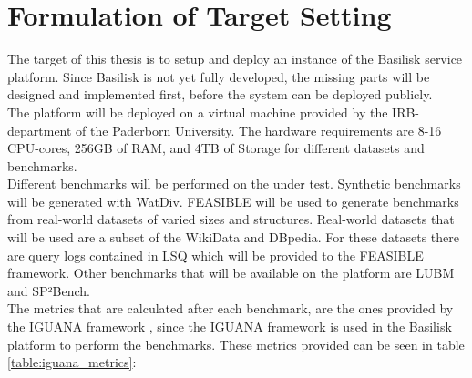 \chapter{Formulation of Target Setting}
\label{ch:target_setting}

The target of this thesis is to setup and deploy an instance of the Basilisk service platform.
Since Basilisk is not yet fully developed, the missing parts will be designed and implemented first, before the system can be deployed publicly. \\

The platform will be deployed on a virtual machine provided by the IRB-department of the Paderborn University.
The hardware requirements are 8-16 CPU-cores, 256GB of RAM, and 4TB of Storage for different datasets and benchmarks. \\

Different benchmarks will be performed on the \tsp{} under test.
Synthetic benchmarks will be generated with WatDiv\cite{alucDiversifiedStressTesting2014}.
FEASIBLE\cite{saleemFEASIBLEFeatureBasedSPARQL2015} will be used to generate benchmarks from real-world datasets of varied sizes and structures.
Real-world datasets that will be used are a subset of the WikiData and DBpedia.
For these datasets there are query logs contained in LSQ\cite{saleemLSQLinkedSPARQL2015} which will be provided to the FEASIBLE framework.
Other benchmarks that will be available on the platform are LUBM\cite{guoLUBMBenchmarkOWL2005} and SP²Bench\cite{schmidtSP2BenchSPARQLPerformance2008}.\\


The metrics that are calculated after each benchmark, are the ones provided by the IGUANA framework \cite{MetricsIguanaDocumentation}\cite{conradsIguanaGenericFramework2017}, since the IGUANA framework is used in the Basilisk platform to perform the benchmarks.
These metrics provided can be seen in table \ref{table:iguana_metrics}:

